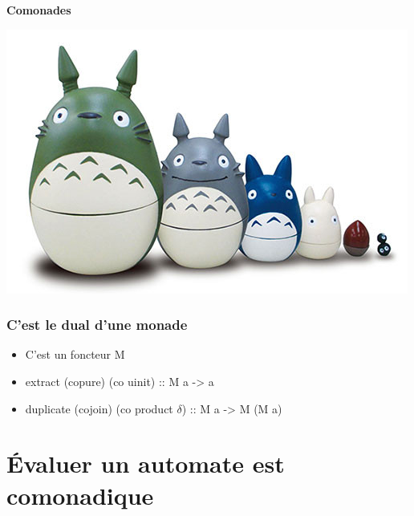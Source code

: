 \documentclass{beamer}
\begin{document}
\begin{frame}
\begin{center}
\textbf{Comonades}
\end{center}

\begin{center}
\includegraphics[scale=0.5]{comonad.jpg}
\end{center}
\end{frame}

\begin{frame}
\frametitle{C'est le dual d'une monade}

\begin{itemize}
\item C'est un foncteur M
\item extract (copure) (co uinit) :: M a -> a
\item duplicate (cojoin) (co product $\delta$) :: M a -> M (M a)
\end{itemize}
\end{frame}

\section{Évaluer un automate est comonadique}
\end{document}
